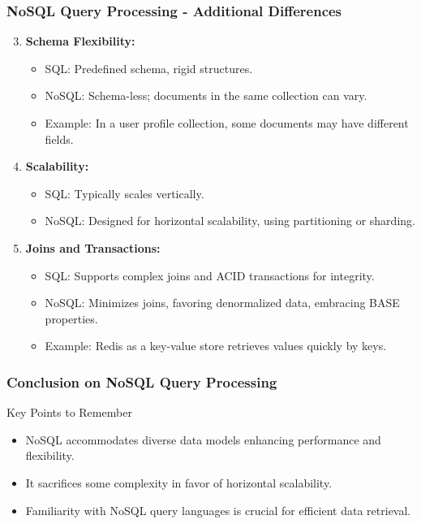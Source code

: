 \documentclass[aspectratio=169]{beamer}
\begin{document}
\begin{frame}[fragile]
    \frametitle{NoSQL Query Processing - Additional Differences}
    \begin{enumerate}
        \setcounter{enumi}{2}
        \item \textbf{Schema Flexibility:}
            \begin{itemize}
                \item SQL: Predefined schema, rigid structures.
                \item NoSQL: Schema-less; documents in the same collection can vary.
                \item Example: In a user profile collection, some documents may have different fields.
            \end{itemize}
        
        \item \textbf{Scalability:}
            \begin{itemize}
                \item SQL: Typically scales vertically.
                \item NoSQL: Designed for horizontal scalability, using partitioning or sharding.
            \end{itemize}
        
        \item \textbf{Joins and Transactions:}
            \begin{itemize}
                \item SQL: Supports complex joins and ACID transactions for integrity.
                \item NoSQL: Minimizes joins, favoring denormalized data, embracing BASE properties.
                \item Example: Redis as a key-value store retrieves values quickly by keys.
            \end{itemize}
    \end{enumerate}
\end{frame}

\begin{frame}[fragile]
    \frametitle{Conclusion on NoSQL Query Processing}
    \begin{block}{Key Points to Remember}
        \begin{itemize}
            \item NoSQL accommodates diverse data models enhancing performance and flexibility.
            \item It sacrifices some complexity in favor of horizontal scalability.
            \item Familiarity with NoSQL query languages is crucial for efficient data retrieval.
        \end{itemize}
    \end{block}
\end{frame}
\end{document}
